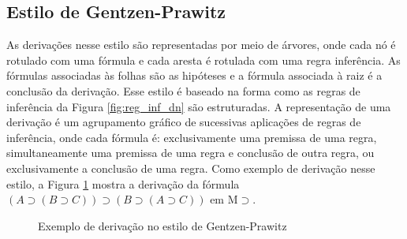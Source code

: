 \subsection{Estilo de Gentzen-Prawitz}
\label{sec:est_gen_pra}

As derivações nesse estilo são representadas por meio de árvores, onde cada nó é rotulado com uma fórmula e cada aresta é rotulada com uma regra inferência. As fórmulas associadas às folhas são as hipóteses e a fórmula associada à raiz é a conclusão da derivação. Esse estilo é baseado na forma como as regras de inferência da Figura \ref{fig:reg_inf_dn} são estruturadas. A representação de uma derivação é um agrupamento gráfico de sucessivas aplicações de regras de inferência, onde cada fórmula é: exclusivamente uma premissa de uma regra, simultaneamente uma premissa de uma regra e conclusão de outra regra, ou exclusivamente a conclusão de uma regra. Como exemplo de derivação nesse estilo, a Figura \ref{fig:exemp_gen_pra} mostra a derivação da fórmula $(A \supset (B \supset C)) \supset (B \supset (A \supset C))$ em M$\supset$.

\begin{figure}[ht]
    \begin{center}
        \begin{prooftree}
        \end{prooftree}
    \caption{Exemplo de derivação no estilo de Gentzen-Prawitz}
    \label{fig:exemp_gen_pra}
    \end{center}
\end{figure}

